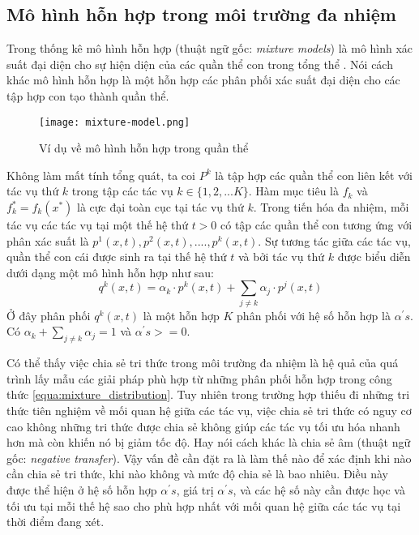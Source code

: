 \subsection{Mô hình hỗn hợp trong môi trường đa nhiệm}
Trong thống kê mô hình hỗn hợp (thuật ngữ gốc: \emph{mixture models}) là mô hình xác suất đại diện cho sự hiện diện của các quần thể con trong tổng thể \cite{rasmussen2000infinite}. Nói cách khác mô hình hỗn hợp là một hỗn hợp các phân phối xác suất đại diện cho các tập hợp con tạo thành quần thể.
\\[0.5cm]
\begin{figure}[h!]
    \centering
        \texttt{[image: mixture-model.png]}
    \caption{Ví dụ về mô hình hỗn hợp trong quần thể}
    \label{fig:mixture-model}
\end{figure}

Không làm mất tính tổng quát, ta coi $P^k$ là tập hợp các quần thể con liên kết với tác vụ thứ $k$ trong tập các tác vụ $k \in \{1,2,...K\}$. Hàm mục tiêu là $f_k$ và $f_k^* = f_k(x^*)$ là cực đại toàn cục tại tác vụ thứ $k$. Trong tiến hóa đa nhiệm, mỗi tác vụ các tác vụ tại một thế hệ thứ $t > 0$ có tập các quần thể con tương ứng với phân xác suất là $p^1(x,t), p^2(x,t),...., p^k(x,t)$. Sự tương tác giữa các tác vụ, quần thể con cái được sinh ra tại thế hệ thứ $t$ và bởi tác vụ thứ $k$ được biểu diễn dưới dạng một mô hình hỗn hợp như sau:
\begin{equation}
    q^k(x,t) = \alpha_k \cdot p^k(x,t) + \sum_{j \neq k} \alpha_j \cdot p^j(x,t)
    \label{equa:mixture_distribution}
\end{equation}
Ở đây phân phối $q^k(x,t)$ là một hỗn hợp $K$ phân phối với hệ số hỗn hợp là $\alpha^{'}s$. Có $\alpha_k + \sum_{j \neq k} \alpha_j = 1$ và $\alpha^{'}s >= 0$. 

Có thể thấy việc chia sẻ tri thức trong môi trường đa nhiệm là hệ quả của quá trình lấy mẫu các giải pháp phù hợp từ những phân phối hỗn hợp trong công thức \ref{equa:mixture_distribution}. Tuy nhiên trong trường hợp thiếu đi những tri thức tiên nghiệm về mối quan hệ giữa các tác vụ, việc chia sẻ tri thức có nguy cơ cao không những tri thức được chia sẻ không giúp các tác vụ tối ưu hóa nhanh hơn mà còn khiến nó bị giảm tốc độ. Hay nói cách khác là chia sẻ âm (thuật ngữ gốc: \emph{negative transfer}). Vậy vấn đề cần đặt ra là làm thế nào để xác định khi nào cần chia sẻ tri thức, khi nào không và mức độ chia sẻ là bao nhiêu. Điều này được thể hiện ở hệ số hỗn hợp $\alpha^{'}s$, giá trị $\alpha^{'}s$, và các hệ số này cần được học và tối ưu tại mỗi thế hệ sao cho phù hợp nhất với mối quan hệ giữa các tác vụ tại thời điểm đang xét.

